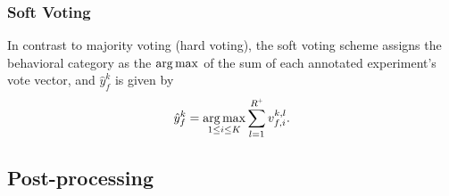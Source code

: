 \subsubsection{Soft Voting}
In contrast to majority voting (hard voting), the soft voting scheme assigns the behavioral category as the $\operatorname*{arg\,max}$ of the sum of each annotated experiment's vote vector, and $\hat{y}^k_f$ is given by
\begin{equation}
	\hat{y}^k_f = \argmax_{1 \leq i \leq K} \sum_{l=1}^{\Ann{R}} v_{f,i}^{k,l}.
\end{equation}

\subsection{Post-processing}\label{section:postprocessing-predictions}

